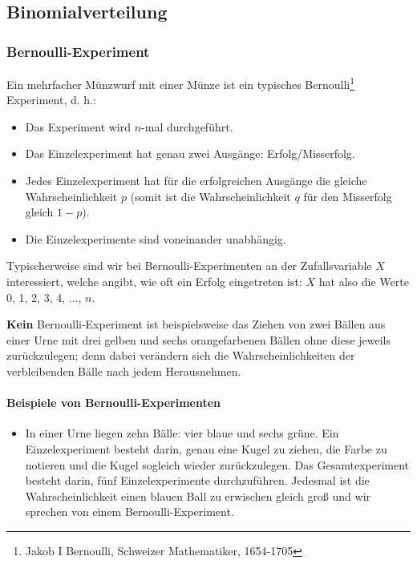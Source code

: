 \newpage


\subsection{Binomialverteilung}



\subsubsection{Bernoulli-Experiment}
Ein mehrfacher Münzwurf mit einer Münze ist ein typisches
Bernoulli\footnote{Jakob I Bernoulli, Schweizer Mathematiker,
  1654-1705} Experiment, d. h.:

\begin{itemize}
\item Das Experiment wird $n$-mal durchgeführt.
\item Das Einzelexperiment hat genau zwei Ausgänge: Erfolg/Misserfolg.
\item Jedes Einzelexperiment hat für die erfolgreichen Ausgänge die gleiche
      Wahrscheinlichkeit $p$ (somit ist die Wahrscheinlichkeit $q$ für den
      Misserfolg gleich $1-p$).
\item Die Einzelexperimente sind voneinander unabhängig.
\end{itemize}

Typischerweise sind wir bei Bernoulli-Experimenten an der
Zufallsvariable $X$ interessiert, welche angibt, wie oft ein Erfolg
eingetreten ist: $X$ hat also die Werte 0, 1, 2, 3, 4, ..., $n$.

\textbf{Kein} Bernoulli-Experiment ist beispielsweise das Ziehen von zwei Bällen aus
einer Urne mit drei gelben und sechs orangefarbenen Bällen ohne diese
jeweils zurückzulegen; denn dabei verändern sich die
Wahrscheinlichkeiten der verbleibenden Bälle nach jedem Herausnehmen.

\paragraph{Beispiele von Bernoulli-Experimenten}

\begin{itemize}
\item
In einer Urne liegen zehn Bälle: vier blaue und sechs grüne. Ein
Einzelexperiment besteht darin, genau eine Kugel zu ziehen, die Farbe
zu notieren und die Kugel sogleich wieder zurückzulegen.
Das Gesamtexperiment besteht darin, fünf Einzelexperimente
durchzuführen. Jedesmal ist die Wahrscheinlichkeit einen blauen Ball
zu erwischen  gleich groß und wir sprechen von einem Bernoulli-Experiment.
\end{itemize}


